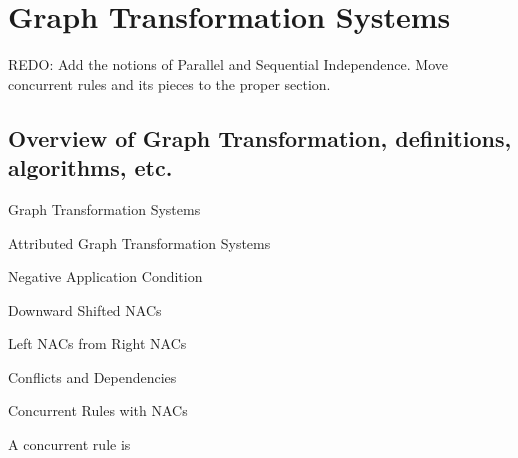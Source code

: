 \chapter{Graph Transformation Systems}

REDO: Add the notions of Parallel and Sequential Independence. Move concurrent rules and its pieces to the proper section.

\section{Overview of Graph Transformation, definitions, algorithms, etc.}

\begin{mydef}{Graph Transformation Systems}
\end{mydef}

\begin{mydef}{Attributed Graph Transformation Systems}
\end{mydef}

\begin{mydef}{Negative Application Condition}

\centerline{}

\end{mydef}

\begin{mydef}{Downward Shifted NACs}

\centerline{}


\end{mydef}

\begin{mydef}{Left NACs from Right NACs}

\centerline{}

\end{mydef}

\begin{mydef}{Conflicts and Dependencies}
\end{mydef}

\begin{mydef}{Concurrent Rules with NACs}

A concurrent rule is
\end{mydef}

